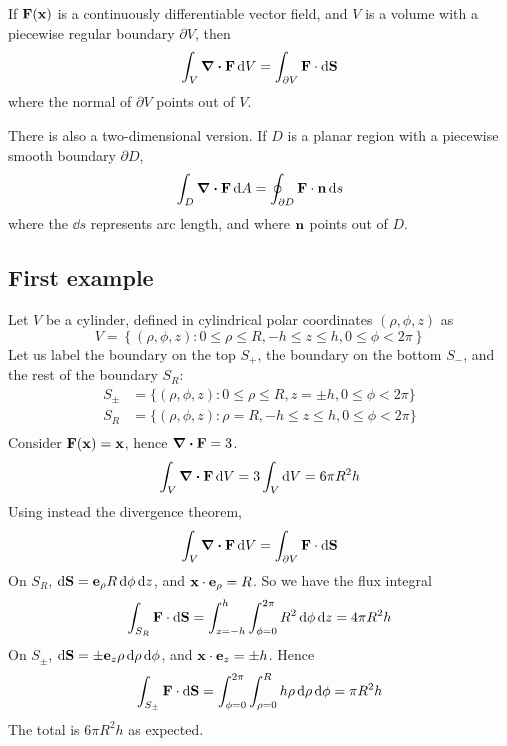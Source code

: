 \begin{proposition}
	If \(\vb F(\vb x)\) is a continuously differentiable vector field, and \(V\) is a volume with a piecewise regular boundary \(\partial V\), then
	\[
		\int_V \div{\vb F} \dd{V} = \int_{\partial V} \vb F \cdot \dd{\vb S}
	\]
	where the normal of \(\partial V\) points out of \(V\).
\end{proposition}
\noindent There is also a two-dimensional version.
If \(D\) is a planar region with a piecewise smooth boundary \(\partial D\),
\[
	\int_D \div{\vb F} \dd{A} = \oint_{\partial D} \vb F \cdot \vb n \dd{s}
\]
where the \(\dd{s}\) represents arc length, and where \(\vb n\) points out of \(D\).

\subsection{First example}
Let \(V\) be a cylinder, defined in cylindrical polar coordinates \((\rho, \phi, z)\) as
\[
	V = \left\{ (\rho, \phi, z) \colon 0 \leq \rho \leq R, -h \leq z \leq h, 0 \leq \phi < 2 \pi \right\}
\]
Let us label the boundary on the top \(S_+\), the boundary on the bottom \(S_-\), and the rest of the boundary \(S_R\):
\begin{align*}
	S_\pm & = \{ (\rho, \phi, z) \colon 0 \leq \rho \leq R, z = \pm h, 0 \leq \phi < 2 \pi \} \\
	S_R   & = \{ (\rho, \phi, z) \colon \rho = R, -h \leq z \leq h, 0 \leq \phi < 2 \pi \}    \\
\end{align*}
Consider \(\vb F(\vb x) = \vb x\), hence \(\div{\vb F} = 3\).
\[
	\int_V \div{\vb F} \dd{V} = 3 \int_V \dd{V} = 6\pi R^2 h
\]
Using instead the divergence theorem,
\[
	\int_V \div{\vb F} \dd{V} = \int_{\partial V} \vb F \cdot \dd{\vb S}
\]
On \(S_R\), \(\dd{\vb S} = \vb e_\rho R \dd{\phi}\dd{z}\), and \(\vb x \cdot \vb e_\rho = R\).
So we have the flux integral
\[
	\int_{S_R} \vb F \cdot \dd{\vb S} = \int_{z = -h}^h \int_{\phi = 0}^{2 \pi} R^2 \dd{\phi} \dd{z} = 4\pi R^2 h
\]
On \(S_\pm\), \(\dd{\vb S} = \pm \vb e_z \rho \dd{\rho}\dd{\phi}\), and \(\vb x \cdot \vb e_z = \pm h\).
Hence
\[
	\int_{S_\pm} \vb F \cdot \dd{\vb S} = \int_{\phi = 0}^{2 \pi} \int_{\rho = 0}^R h \rho\dd{\rho}\dd{\phi} = \pi R^2 h
\]
The total is \(6\pi R^2 h\) as expected.

